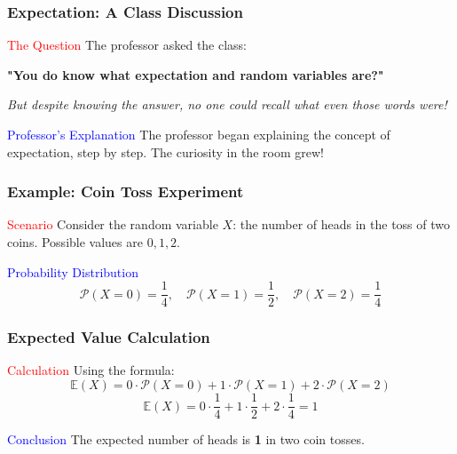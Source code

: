 \begin{frame}
    \frametitle{Expectation: A Class Discussion}
    \vspace{0.3cm}

    \begin{block}{\textcolor{red}{The Question}}
        The professor asked the class:
        \begin{center}
            \textbf{"You do know what expectation and random variables are?"}
        \end{center}
        \textit{But despite knowing the answer, no one could recall what even those words were!}
    \end{block}
    \vspace{0.4cm}

    \begin{block}{\textcolor{blue}{Professor's Explanation}}
        The professor began explaining the concept of expectation, step by step. The curiosity in the room grew!
    \end{block}
    \vspace{0.4cm}

\end{frame}

\begin{frame}
    \frametitle{Example: Coin Toss Experiment}
    \vspace{0.3cm}

    \begin{block}{\textcolor{red}{Scenario}}
        Consider the random variable \(X\): the number of heads in the toss of two coins. Possible values are \(0, 1, 2\).
    \end{block}
    \vspace{0.4cm}

    \begin{block}{\textcolor{blue}{Probability Distribution}}
        \[
        \mathcal{P}(X = 0) = \frac{1}{4}, \quad \mathcal{P}(X = 1) = \frac{1}{2}, \quad \mathcal{P}(X = 2) = \frac{1}{4}
        \]
    \end{block}

\end{frame}

\begin{frame}
    \frametitle{Expected Value Calculation}
    \vspace{0.3cm}

    \begin{block}{\textcolor{red}{Calculation}}
        Using the formula:
        \[ \mathbb{E}(X) = 0 \cdot \mathcal{P}(X=0) + 1 \cdot \mathcal{P}(X=1) + 2 \cdot \mathcal{P}(X=2) \]
        \[ \mathbb{E}(X) = 0 \cdot \frac{1}{4} + 1 \cdot \frac{1}{2} + 2 \cdot \frac{1}{4} = 1 \]
    \end{block}
    \vspace{0.4cm}

    \begin{block}{\textcolor{blue}{Conclusion}}
        The expected number of heads is \textbf{1} in two coin tosses.
    \end{block}

\end{frame}

